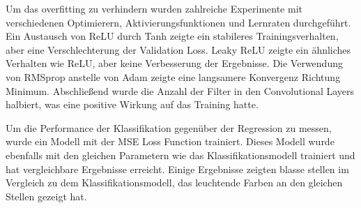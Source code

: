 Um das \gls{overfitting} zu verhindern wurden zahlreiche Experimente mit verschiedenen Optimierern, Aktivierungsfunktionen und Lernraten durchgeführt.
Ein Austausch von ReLU durch Tanh zeigte ein stabileres Trainingsverhalten, aber eine Verschlechterung der Validation Loss. Leaky ReLU zeigte
ein ähnliches Verhalten wie ReLU, aber keine Verbesserung der Ergebnisse. Die Verwendung von RMSprop anstelle von Adam zeigte eine langsamere Konvergenz Richtung Minimum.
Abschließend wurde die Anzahl der Filter in den Convolutional Layers halbiert, was eine positive Wirkung auf das Training hatte.

Um die Performance der Klassifikation gegenüber der Regression zu messen, wurde ein Modell mit der MSE Loss Function trainiert. Dieses Modell
wurde ebenfalls mit den gleichen Parametern wie das Klassifikationsmodell trainiert und hat vergleichbare Ergebnisse erreicht. Einige Ergebnisse
zeigten blasse stellen im Vergleich zu dem Klassifikationsmodell, das leuchtende Farben an den gleichen Stellen gezeigt hat.

